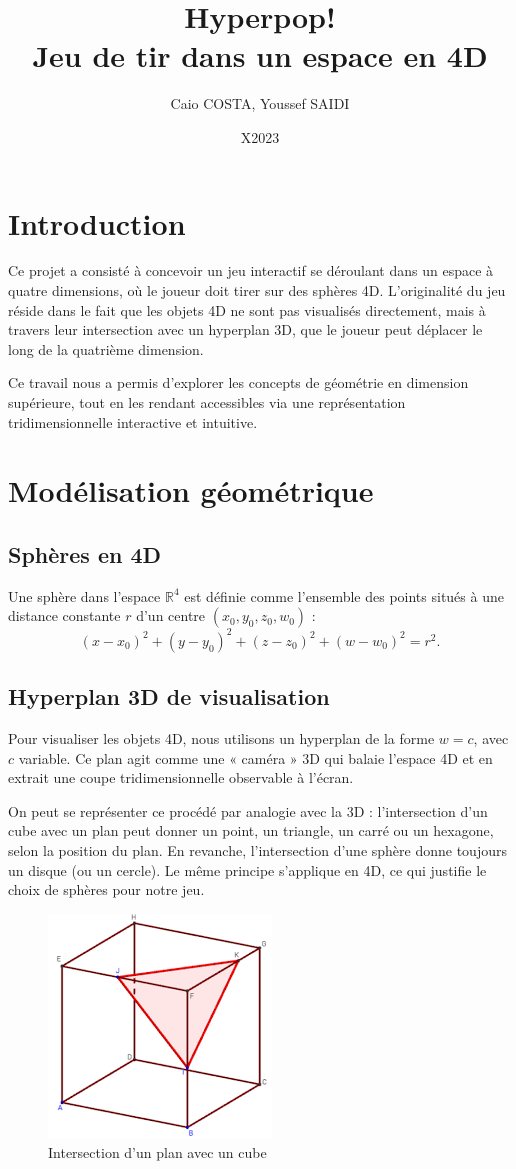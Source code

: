 \documentclass[11pt,a4paper]{article}
\title{Hyperpop! \\ \normalsize{Jeu de tir dans un espace en 4D}}
\author{Caio COSTA, Youssef SAIDI}
\date{X2023}
\begin{document}
\maketitle

\section{Introduction}

Ce projet a consisté à concevoir un jeu interactif se déroulant dans un espace à quatre dimensions, où le joueur doit tirer sur des sphères 4D. L’originalité du jeu réside dans le fait que les objets 4D ne sont pas visualisés directement, mais à travers leur intersection avec un hyperplan 3D, que le joueur peut déplacer le long de la quatrième dimension.

Ce travail nous a permis d'explorer les concepts de géométrie en dimension supérieure, tout en les rendant accessibles via une représentation tridimensionnelle interactive et intuitive.

\section{Modélisation géométrique}

\subsection{Sphères en 4D}

Une sphère dans l’espace $\mathbb{R}^4$ est définie comme l’ensemble des points situés à une distance constante $r$ d’un centre $(x_0, y_0, z_0, w_0)$ :
\[
	(x - x_0)^2 + (y - y_0)^2 + (z - z_0)^2 + (w - w_0)^2 = r^2.
\]

\subsection{Hyperplan 3D de visualisation}

Pour visualiser les objets 4D, nous utilisons un hyperplan de la forme $w = c$, avec $c$ variable. Ce plan agit comme une « caméra » 3D qui balaie l’espace 4D et en extrait une coupe tridimensionnelle observable à l’écran.

On peut se représenter ce procédé par analogie avec la 3D : l’intersection d’un cube avec un plan peut donner un point, un triangle, un carré ou un hexagone, selon la position du plan. En revanche, l’intersection d’une sphère donne toujours un disque (ou un cercle). Le même principe s’applique en 4D, ce qui justifie le choix de sphères pour notre jeu.
\begin{figure}[H]
	\centering
	\includegraphics[width=0.3\linewidth]{intersection-cube}
	\caption{Intersection d’un plan avec un cube}
	\label{fig:inter-plan-cube}
\end{figure}
\end{document}
